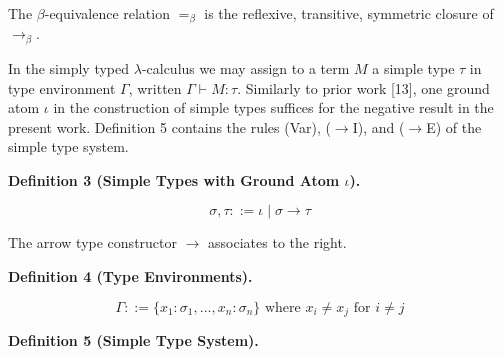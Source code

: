  
 
 
The $\beta$-equivalence relation $=_{\beta}$ is the reflexive, transitive, symmetric closure of $\to_{\beta}$.\par
 
 
 
In the simply typed $\lambda$-calculus we may assign to a term $M$ a simple type $\tau$ in type environment $\Gamma$, written $\Gamma\vdash M:\tau$. Similarly to prior work [13], one ground atom $\iota$ in the construction of simple types suffices for the negative result in the present work. Definition 5 contains the rules (Var), ($\to$I), and ($\to$E) of the simple type system.\par
 
  
 
\par\medskip\noindent\textbf{Definition 3 (Simple Types with Ground Atom $\iota$).}\par
 
 
\par
    \[\sigma,\tau::=\iota\mid\sigma\to\tau\]    
 
 
 
The arrow type constructor $\to$ associates to the right.\par
 
 
 
\par\medskip\noindent\textbf{Definition 4 (Type Environments).}\par
 
    \[\Gamma::=\{x_{1}:\sigma_{1},\ldots,x_{n}:\sigma_{n}\}\text{ where }x_{i}\neq x%
_{j}\text{ for }i\neq j\]    
 
 
 
\par\medskip\noindent\textbf{Definition 5 (Simple Type System).}\par
 
